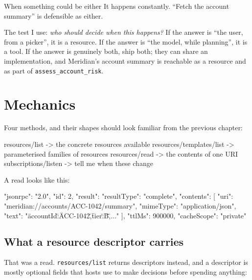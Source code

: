 \begin{notebox}{When something could be either}
It happens constantly. ``Fetch the account summary'' is defensible as either.

The test I use: \emph{who should decide when this happens?} If the answer is
``the user, from a picker'', it is a resource. If the answer is ``the model,
while planning'', it is a tool. If the answer is genuinely both, ship both; they
can share an implementation, and Meridian's account summary is reachable as a
resource and as part of \texttt{assess\_account\_risk}.
\end{notebox}

\section{Mechanics}

Four methods, and their shapes should look familiar from the previous chapter:

\begin{wire}
resources/list             -> the concrete resources available
resources/templates/list   -> parameterised families of resources
resources/read             -> the contents of one URI
subscriptions/listen       -> tell me when these change
\end{wire}

A read looks like this:

\begin{wire}
{
  "jsonrpc": "2.0",
  "id": 2,
  "result": {
    "resultType": "complete",
    "contents": [
      {
        "uri": "meridian://accounts/ACC-1042/summary",
        "mimeType": "application/json",
        "text": "{\"accountId\":\"ACC-1042\",\"tier\":\"B\",...}"
      }
    ],
    "ttlMs": 900000,
    "cacheScope": "private"
  }
}
\end{wire}

\subsection{What a resource descriptor carries}

That was a read. \texttt{resources/list} returns descriptors instead, and a
descriptor is mostly optional fields that hosts use to make decisions before
spending anything:

